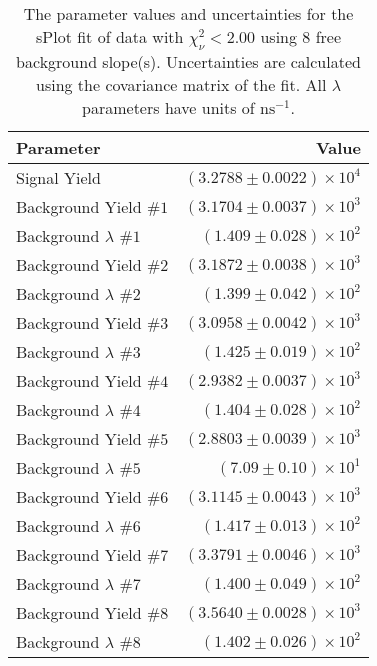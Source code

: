 
\begin{table}
    \begin{center}
        \begin{tabular}{lr}\toprule
            Parameter & Value \\\midrule
            Signal Yield & $(3.2788 \pm 0.0022) \times 10^{4}$ \\
            Background Yield $\#1$ & $(3.1704 \pm 0.0037) \times 10^{3}$ \\
            Background $\lambda$ $\#1$ & $(1.409 \pm 0.028) \times 10^{2}$ \\
            Background Yield $\#2$ & $(3.1872 \pm 0.0038) \times 10^{3}$ \\
            Background $\lambda$ $\#2$ & $(1.399 \pm 0.042) \times 10^{2}$ \\
            Background Yield $\#3$ & $(3.0958 \pm 0.0042) \times 10^{3}$ \\
            Background $\lambda$ $\#3$ & $(1.425 \pm 0.019) \times 10^{2}$ \\
            Background Yield $\#4$ & $(2.9382 \pm 0.0037) \times 10^{3}$ \\
            Background $\lambda$ $\#4$ & $(1.404 \pm 0.028) \times 10^{2}$ \\
            Background Yield $\#5$ & $(2.8803 \pm 0.0039) \times 10^{3}$ \\
            Background $\lambda$ $\#5$ & $(7.09 \pm 0.10) \times 10^{1}$ \\
            Background Yield $\#6$ & $(3.1145 \pm 0.0043) \times 10^{3}$ \\
            Background $\lambda$ $\#6$ & $(1.417 \pm 0.013) \times 10^{2}$ \\
            Background Yield $\#7$ & $(3.3791 \pm 0.0046) \times 10^{3}$ \\
            Background $\lambda$ $\#7$ & $(1.400 \pm 0.049) \times 10^{2}$ \\
            Background Yield $\#8$ & $(3.5640 \pm 0.0028) \times 10^{3}$ \\
            Background $\lambda$ $\#8$ & $(1.402 \pm 0.026) \times 10^{2}$ \\\bottomrule
        \end{tabular}
        \caption{The parameter values and uncertainties for the sPlot fit of data with $\chi^2_\nu < 2.00$ using 8 free background slope(s). Uncertainties are calculated using the covariance matrix of the fit. All $\lambda$ parameters have units of $\si{\nano\second}^{-1}$.}
    \end{center}
\end{table}
